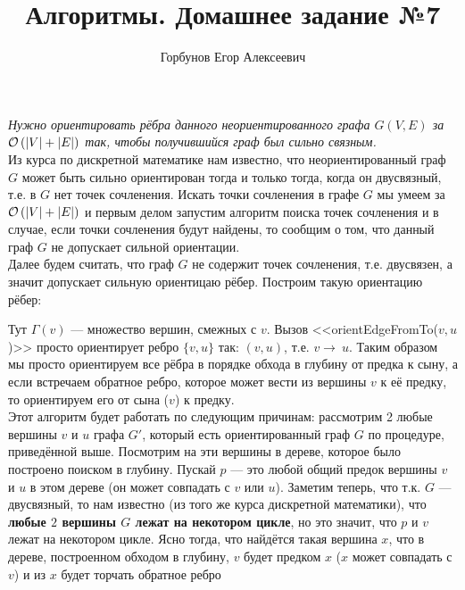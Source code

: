 
\title{Алгоритмы. Домашнее задание №7}
\author{Горбунов Егор Алексеевич}


\maketitle

\textit{Нужно ориентировать рёбра данного неориентированного графа $G(V,E)$ за $\mathcal{O}\left(|V|+|E|\right)$ так, чтобы получившийся граф был сильно связным.}\\
Из курса по дискретной математике нам известно, что неориентированный граф $G$ может быть сильно ориентирован тогда и
только тогда, когда он двусвязный, т.е. в $G$ нет точек сочленения. Искать точки сочленения в графе $G$ мы умеем за 
$\mathcal{O}\left(|V|+|E|\right)$ и первым делом запустим алгоритм поиска точек сочленения и в случае, если точки сочленения будут найдены, то сообщим о том, что данный граф $G$ не допускает сильной ориентации.\\
Далее будем считать, что граф $G$ не содержит точек сочленения, т.е. двусвязен, а значит допускает сильную ориентицаю
рёбер. Построим такую ориентацию рёбер:
\begin{algorithmic}
		\EndIf
	\EndFor
\EndProcedure
\end{algorithmic}
Тут $\Gamma{(v)}$ --- множество вершин, смежных с $v$. 
Вызов <<orientEdgeFromTo($v,u$)>> просто ориентирует ребро $\lbrace v, u \rbrace$ так: $(v,u)$, т.е. $v\rightarrow~u$.
Таким образом мы просто ориентируем все рёбра в порядке обхода в глубину от предка к сыну, а если встречаем обратное ребро, которое может вести из вершины $v$ к её предку, то ориентируем его от сына ($v$) к предку.\\
Этот алгоритм будет работать по следующим причинам: рассмотрим 2 любые вершины $v$ и $u$ графа $G'$, который 
есть ориентированный граф $G$ по процедуре, приведённой выше. Посмотрим на эти вершины в дереве, которое было построено поиском в глубину. Пускай $p$ --- это любой общий предок вершины $v$ и $u$ в этом дереве (он  может совпадать с $v$ или $u$).
Заметим теперь, что т.к. $G$ --- двусвязный, то нам известно (из того же курса дискретной математики), что \textbf{любые $2$ вершины $G$ лежат на некотором цикле}, но 
это значит, что $p$ и $v$ лежат на некотором цикле. Ясно тогда, что найдётся такая вершина $x$, что в дереве, построенном обходом в глубину, $v$ будет предком $x$ ($x$ может совпадать с $v$) и из $x$ будет торчать обратное ребро
